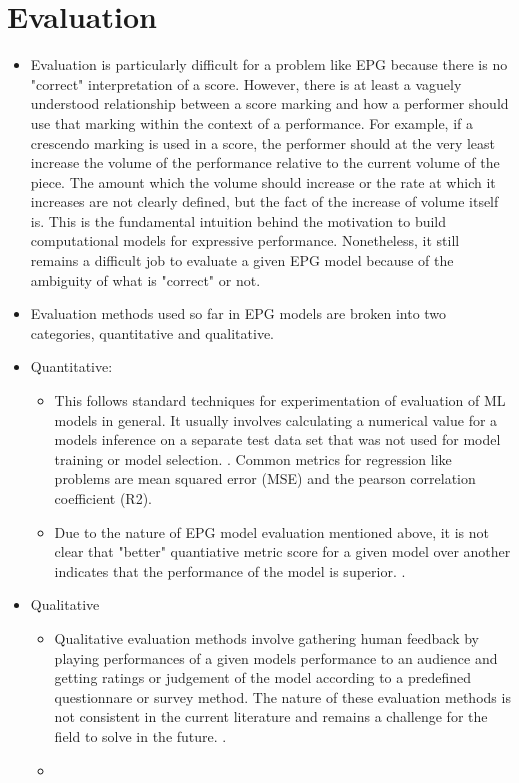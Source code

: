 \section{Evaluation}
\begin{itemize}
    \item Evaluation is particularly difficult for a problem like EPG because there is no "correct" interpretation of a score. However, there is at least a vaguely understood relationship between a score marking and how a performer should use that marking within the context of a performance. For example, if a crescendo marking is used in a score, the performer should at the very least increase the volume of the performance relative to the current volume of the piece. The amount which the volume should increase or the rate at which it increases are not clearly defined, but the fact of the increase of volume itself is. This is the fundamental intuition behind the motivation to build computational models for expressive performance. Nonetheless, it still remains a difficult job to evaluate a given EPG model because of the ambiguity of what is "correct" or not.
    \item Evaluation methods used so far in EPG models are broken into two categories, quantitative and qualitative. 
    \item Quantitative: 
    \begin{itemize}
        \item This follows standard techniques for experimentation of evaluation of ML models in general. It usually involves calculating a numerical value for a models inference on a separate test data set that was not used for model training or model selection. . Common metrics for regression like problems are mean squared error (MSE) and the pearson correlation coefficient (R2). 
        \item Due to the nature of EPG model evaluation mentioned above, it is not clear that "better" quantiative metric score for a given model over another indicates that the performance of the model is superior. . 
    \end{itemize}
    \item Qualitative
    \begin{itemize}
        \item Qualitative evaluation methods involve gathering human feedback by playing performances of a given models performance to an audience and getting ratings or judgement of the model according to a predefined questionnare or survey method. The nature of these evaluation methods is not consistent in the current literature and remains a challenge for the field to solve in the future. . 
        \item {}
    \end{itemize}
\end{itemize}



